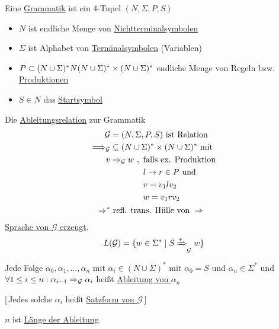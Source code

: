 \begin{Def}[Chomsky]
	Eine \underline{Grammatik} ist ein 4-Tupel $(N,\Sigma,P,S)$
	\begin{itemize}
	\item $N$ ist endliche Menge von \underline{Nichtterminalsymbolen}
	\item $\Sigma$ ist Alphabet von \underline{Terminalsymbolen} (Variablen)
	\item $P\subset (N\cup\Sigma)^*N(N\cup\Sigma)^* \times (N\cup\Sigma)^*$ endliche Menge von Regeln bzw. \underline{Produktionen}
	\item $S\in N$ das \underline{Startsymbol}
	\end{itemize}
\end{Def}
\begin{Def}[name={[Ableitungsrelation]}]
	Die \underline{Ableitungsrelation} zur Grammatik
	\begin{align*}
		\mathcal{G} &=(N,\Sigma,P,S) \text{ ist Relation}\\
		\==>_{\mathcal{G}}& \subseteq (N\cup\Sigma)^*\x(N\cup\Sigma)^*\text{ mit}\\
		v&\=>_{\mathcal{G}} w\ ,\ 
		\begin{aligned}[t]
			&\text{falls ex. Produktion}\\
			&l \-> r\in P\text{ und }\\
			&v = v_1lv_2\\
			&w=v_1rv_2
		\end{aligned}\\
		\=>^*& \text{ refl. trans. Hülle von }\=>
	\end{align*}
	\underline{Sprache von $\mathcal{G}$ erzeugt}.
	\[ L(\mathcal{G}) = \{w\in\Sigma^* \mid S\xRightarrow*_{\mathcal{G}} w \}\]
	
	Jede Folge $\alpha_0,\alpha_1,\dots,\alpha_n$ mit $\alpha_i \in (N\cup \Sigma)^*$ mit $\alpha_0=S$ und $\alpha_n\in\Sigma^*$ und $\forall 1\leq i\leq n : \alpha_{i-1} \=>_\mathcal{G} \alpha_i$ heißt \underline{Ableitung von $\alpha_n$}
	
	[\,Jedes solche $\alpha_i$ heißt \underline{Satzform von $\mathcal{G}$}\,]
\end{Def}
$n$ ist \underline{Länge der Ableitung}.
\vspace{.5em}
